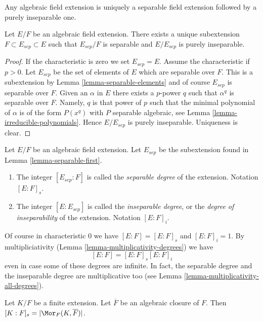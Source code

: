 \begin{lemma}
\label{lemma-separable-first}
\begin{slogan}
Any algebraic field extension is uniquely a separable field extension
followed by a purely inseparable one.
\end{slogan}
Let $E/F$ be an algebraic field extension. There exists a unique subextension
$F \subset E_{sep} \subset E$ such that $E_{sep}/F$ is separable and
$E/E_{sep}$ is purely inseparable.
\end{lemma}

\begin{proof}
If the characteristic is zero we set $E_{sep} = E$. Assume the characteristic
if $p > 0$. Let $E_{sep}$ be the set of elements of $E$ which are separable
over $F$. This is a subextension by Lemma \ref{lemma-separable-elements}
and of course $E_{sep}$ is separable over $F$. Given an $\alpha$ in $E$
there exists a $p$-power $q$ such that $\alpha^q$ is separable over $F$.
Namely, $q$ is that power of $p$ such that the minimal polynomial of
$\alpha$ is of the form $P(x^q)$ with $P$ separable algebraic, see
Lemma \ref{lemma-irreducible-polynomials}. Hence $E/E_{sep}$ is purely
inseparable. Uniqueness is clear.
\end{proof}

\begin{definition}
\label{definition-insep-degree}
Let $E/F$ be an algebraic field extension. Let $E_{sep}$ be the subextension
found in Lemma \ref{lemma-separable-first}.
\begin{enumerate}
\item The integer $[E_{sep} : F]$ is called the {\it separable
degree} of the extension. Notation $[E : F]_s$.
\item The integer $[E : E_{sep}]$ is called the {\it inseparable
degree}, or the {\it degree of inseparability} of the extension.
Notation $[E : F]_i$.
\end{enumerate}
\end{definition}

\noindent
Of course in characteristic $0$ we have $[E : F] = [E : F]_s$ and
$[E : F]_i = 1$. By multipliciativity
(Lemma \ref{lemma-multiplicativity-degrees}) we have
$$
[E : F] = [E : F]_s [E : F]_i
$$
even in case some of these degrees are infinite. In fact, the separable
degree and the inseparable degree are multiplicative too (see
Lemma \ref{lemma-multiplicativity-all-degrees}).

\begin{lemma}
\label{lemma-separable-degree}
Let $K/F$ be a finite extension. Let $\overline{F}$ be an algebraic
closure of $F$. Then $[K : F]_s = |\Mor_F(K, \overline{F})|$.
\end{lemma}

